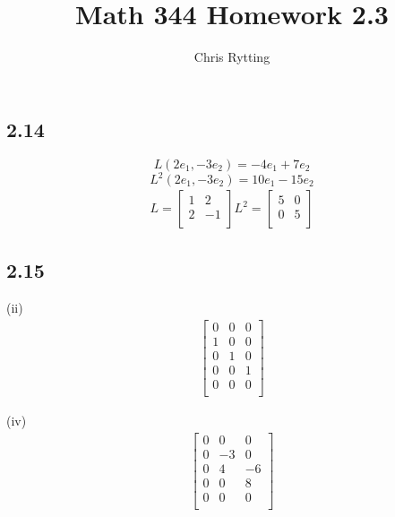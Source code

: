\documentclass[letterpaper,12pt]{article}
\theoremstyle{definition}
\begin{document}
\title{Math 344 Homework 2.3}
\author{Chris Rytting}
\maketitle

\subsection*{2.14}
\[L(2e_1, -3e_2) = -4e_1 + 7e_2\]
\[L^2(2e_1, -3e_2) = 10e_1  -15e_2\]
\begin{align*}
    L =
    \begin{bmatrix}
        1 & 2 \\
        2 & -1 \\
    \end{bmatrix}
    L^2 =
    \begin{bmatrix}
        5 & 0 \\
        0 & 5 \\
    \end{bmatrix}
\end{align*}



\subsection*{2.15}
(ii)
\begin{align*}
\begin{bmatrix}
    0 & 0 & 0\\
    1 & 0 & 0\\
    0 & 1 & 0\\
    0 & 0 & 1\\
    0 & 0 & 0\\
\end{bmatrix}
\end{align*}

(iv)
\begin{align*}
\begin{bmatrix}
    0 & 0 & 0\\
    0 & -3 & 0\\
    0 & 4 & -6\\
    0 & 0 & 8\\
    0 & 0 & 0\\
\end{bmatrix}
\end{align*}
\end{document}
